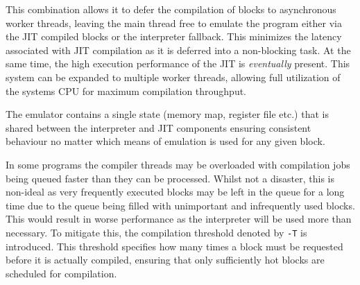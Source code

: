 This combination allows it to defer the compilation of blocks to asynchronous worker threads, leaving the main thread free to emulate the program either via the JIT compiled blocks or the interpreter fallback. This minimizes the latency associated with JIT compilation as it is deferred into a non-blocking task. At the same time, the high execution performance of the JIT is \emph{eventually} present. This system can be expanded to multiple worker threads, allowing full utilization of the systems CPU for maximum compilation throughput.

The emulator contains a single state (memory map, register file etc.) that is shared between the interpreter and JIT components ensuring consistent behaviour no matter which means of emulation is used for any given block.

In some programs the compiler threads may be overloaded with compilation jobs being queued faster than they can be processed. Whilst not a disaster, this is non-ideal as very frequently executed blocks may be left in the queue for a long time due to the queue being filled with unimportant and infrequently used blocks. This would result in worse performance as the interpreter will be used more than necessary. To mitigate this, the compilation threshold denoted by \texttt{-T} is introduced. This threshold specifies how many times a block must be requested before it is actually compiled, ensuring that only sufficiently hot blocks are scheduled for compilation.